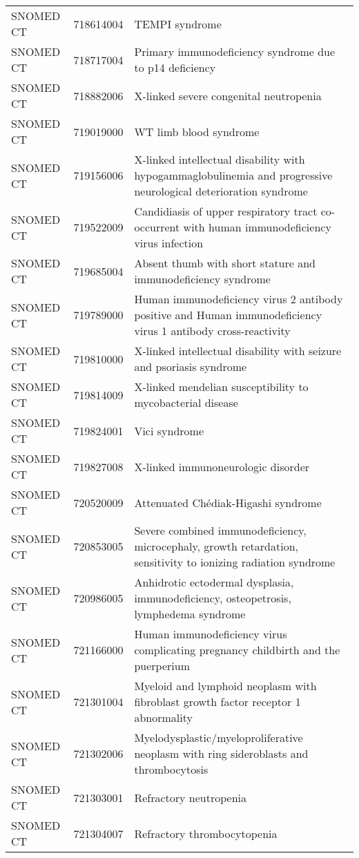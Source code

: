 \begin{table}[ht]
\begin{tabular}{lll}
  SNOMED CT & 718614004 & TEMPI syndrome \\ 
  SNOMED CT & 718717004 & Primary immunodeficiency syndrome due to p14 deficiency \\ 
  SNOMED CT & 718882006 & X-linked severe congenital neutropenia \\ 
  SNOMED CT & 719019000 & WT limb blood syndrome \\ 
  SNOMED CT & 719156006 & X-linked intellectual disability with hypogammaglobulinemia and progressive neurological deterioration syndrome \\ 
  SNOMED CT & 719522009 & Candidiasis of upper respiratory tract co-occurrent with human immunodeficiency virus infection \\ 
  SNOMED CT & 719685004 & Absent thumb with short stature and immunodeficiency syndrome \\ 
  SNOMED CT & 719789000 & Human immunodeficiency virus 2 antibody positive and Human immunodeficiency virus 1 antibody cross-reactivity \\ 
  SNOMED CT & 719810000 & X-linked intellectual disability with seizure and psoriasis syndrome \\ 
  SNOMED CT & 719814009 & X-linked mendelian susceptibility to mycobacterial disease \\ 
  SNOMED CT & 719824001 & Vici syndrome \\ 
  SNOMED CT & 719827008 & X-linked immunoneurologic disorder \\ 
  SNOMED CT & 720520009 & Attenuated Chédiak-Higashi syndrome \\ 
  SNOMED CT & 720853005 & Severe combined immunodeficiency, microcephaly, growth retardation, sensitivity to ionizing radiation syndrome \\ 
  SNOMED CT & 720986005 & Anhidrotic ectodermal dysplasia, immunodeficiency, osteopetrosis, lymphedema syndrome \\ 
  SNOMED CT & 721166000 & Human immunodeficiency virus complicating pregnancy childbirth and the puerperium \\ 
  SNOMED CT & 721301004 & Myeloid and lymphoid neoplasm with fibroblast growth factor receptor 1 abnormality \\ 
  SNOMED CT & 721302006 & Myelodysplastic/myeloproliferative neoplasm with ring sideroblasts and thrombocytosis \\ 
  SNOMED CT & 721303001 & Refractory neutropenia \\ 
  SNOMED CT & 721304007 & Refractory thrombocytopenia \\ 

\end{tabular}
\end{table}
